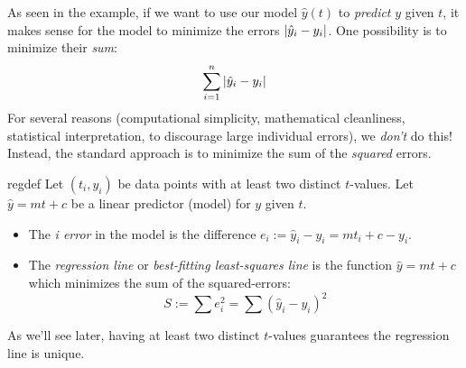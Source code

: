 As seen in the example, if we want to use our model $\hat y(t)$ to \emph{predict} $y$ given $t$, it makes sense for the model to minimize the errors $\left| \hat y_i-y_i\right|$. One possibility is to minimize their \emph{sum}:
\[
	\sum_{i=1}^n\left| \hat y_i-y_i\right|
\]
For several reasons (computational simplicity, mathematical cleanliness, statistical interpretation, to discourage large individual errors), we \emph{don't} do this! Instead, the standard approach is to minimize the sum of the \emph{squared} errors.

\begin{defn}{}{regdef}
	Let $(t_i,y_i)$ be data points with at least two distinct $t$-values. Let $\hat y=mt+c$ be a linear predictor (model) for $y$ given $t$.
	\begin{itemize}\itemsep2pt
	  \item The \emph{i\th{} error} in the model is the difference $e_i:=\hat y_i-y_i=mt_i+c-y_i$.
	  \item The \emph{regression line} or \emph{best-fitting least-squares line} is the function $\hat y=mt+c$ which minimizes the sum of the squared-errors:
	  \[
	  	S:=\sum e_i^2 =\sum (\hat y_i-y_i)^2
	  \]\vspace{-\parsep}
	\end{itemize}
\end{defn}

As we'll see later, having at least two distinct $t$-values guarantees the regression line is unique.

